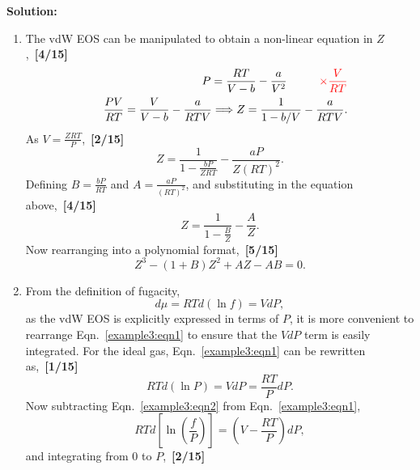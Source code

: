 \documentclass[12pts,a4paper,amsmath,amssymb,floatfix]{article}%
\newcommand{\frc}{\displaystyle\frac}
\newcommand{\red}{\textcolor{red}}
\begin{document}
\begin{enumerate}[label=\bfseries Problem \arabic*]
{\bf Solution:}{\it 
\begin{enumerate}
   \item The vdW EOS can be manipulated to obtain a non-linear equation in $Z$,~\hfill{\bf [4/15]}
        \begin{eqnarray}
           && P = \frc{RT}{V-b} - \frc{a}{V^{2}} \hspace{1cm} \red{\times \frc{V}{RT} }  \nonumber \\
           && \frc{PV}{RT} = \frc{V}{V-b} - \frc{a}{RTV} \Longrightarrow Z=\frc{1}{1- b/V} - \frc{a}{RTV}. \nonumber
        \end{eqnarray}
        As $V=\frc{ZRT}{P}$,~\hfill{\bf [2/15]}
        \begin{displaymath}
          Z = \frc{1}{1-\frc{bP}{ZRT}} - \frc{aP}{Z\left(RT\right)^{2}}.
        \end{displaymath}
        Defining $B=\frc{bP}{RT}$ and $A=\frc{aP}{(RT)^{2}}$, and substituting in the equation above,~\hfill{\bf [4/15]}
        \begin{displaymath}
           Z = \frc{1}{1-\frc{B}{Z}}-\frc{A}{Z}.
        \end{displaymath}
        Now rearranging into a polynomial format,~\hfill{\bf [5/15]}
        \begin{equation}
           Z^{3}-\left(1+B\right)Z^{2} + AZ -AB = 0.
         \label{example3:cubicZ} 
        \end{equation}
   \item From the definition of fugacity, 
      \begin{equation}
           d\mu = RTd\left(\ln f\right) = VdP,\label{example3:eqn1}
      \end{equation}
       as the vdW EOS is explicitly expressed in terms of $P$, it is more convenient to rearrange Eqn.~\ref{example3:eqn1} to ensure that the $VdP$ term is easily integrated. For the ideal gas, Eqn.~\ref{example3:eqn1} can be rewritten as,~\hfill{\bf [1/15]}
      \begin{equation}
           RTd\left(\ln P\right) = VdP = \frc{RT}{P}dP.\label{example3:eqn2}
      \end{equation}
      Now subtracting Eqn.~\ref{example3:eqn2} from Eqn.~\ref{example3:eqn1},
      \begin{displaymath}
           RTd\left[\ln\left(\frc{f}{P}\right)\right] = \left(V-\frc{RT}{P}\right)dP, 
      \end{displaymath}
      and integrating from $0$ to $P$,~\hfill{\bf [2/15]}
      \begin{eqnarray}

\end{eqnarray}
\end{enumerate}}
\end{enumerate}
\end{document}
